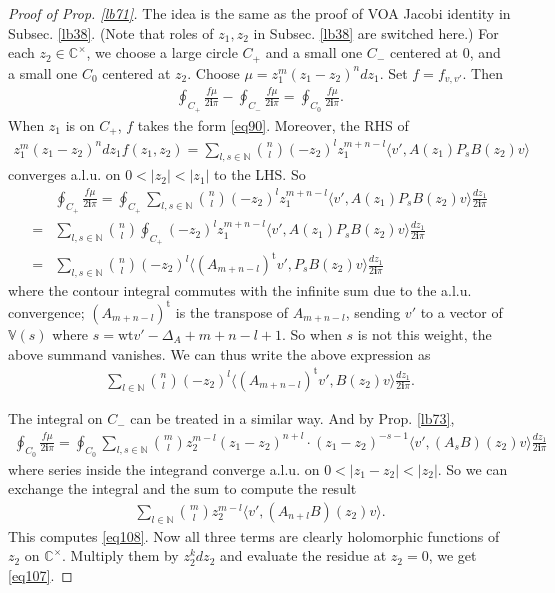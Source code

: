 \documentclass[11pt,b5paper,notitlepage]{article}
\theoremstyle{definition}
\theoremstyle{plain}
\newcommand{\tr}{\mathrm{t}} %
\newcommand{\bk}[1]{\langle {#1}\rangle}
\newcommand{\im}{\mathbf{i}}
\newcommand{\Vbb}{\mathbb V}
\newcommand{\Cbb}{\mathbb C}
\newcommand{\Nbb}{\mathbb N}
\newcommand{\wt}{\mathrm{wt}}
\numberwithin{equation}{section}
\begin{document}
\begin{proof}[Proof of Prop. \ref{lb71}]
The idea is the same as the proof of VOA Jacobi identity in Subsec. \ref{lb38}. (Note that roles of $z_1,z_2$ in Subsec. \ref{lb38} are switched here.) For each $z_2\in\Cbb^\times$, we choose a large circle $C_+$ and a small one $C_-$ centered at $0$, and a small one $C_0$ centered at $z_2$. Choose $\mu=z_1^m(z_1-z_2)^ndz_1$. Set $f=f_{v,v'}$. Then 
\begin{align}\label{eq108}
	\oint_{C_+}\frac{f\mu}{2\im\pi} -\oint_{C_-}\frac{f\mu}{2\im\pi}=\oint_{C_0} \frac{f\mu}{2\im\pi}.	
\end{align}
When $z_1$ is on $C_+$, $f$ takes the form \eqref{eq90}. Moreover, the RHS of
\begin{align*}
z_1^m(z_1-z_2)^ndz_1f(z_1,z_2)=\sum_{l,s\in\Nbb}{n\choose l}(-z_2)^lz_1^{m+n-l}\bk{v',A(z_1)P_sB(z_2)v}	
\end{align*}
converges a.l.u. on $0<|z_2|<|z_1|$ to the LHS. So
\begin{align*}
&\oint_{C_+}\frac{f\mu}{2\im\pi}=\oint_{C_+}\sum_{l,s\in\Nbb}{n\choose l}(-z_2)^lz_1^{m+n-l}\bk{v',A(z_1)P_sB(z_2)v}\frac{dz_1}{2\im\pi}\\
=&\sum_{l,s\in\Nbb}{n\choose l}\oint_{C_+}(-z_2)^lz_1^{m+n-l}\bk{v',A(z_1)P_sB(z_2)v}\frac{dz_1}{2\im\pi}\\
=&\sum_{l,s\in\Nbb}{n\choose l}(-z_2)^l\bk{(A_{m+n-l})^\tr v',P_sB(z_2)v}\frac{dz_1}{2\im\pi}
\end{align*}
where the contour integral commutes with the infinite sum due to the a.l.u. convergence; $(A_{m+n-l})^\tr$ is the transpose of $A_{m+n-l}$, sending $v'$ to a vector of $\Vbb(s)$ where $s=\wt v'-\Delta_A+m+n-l+1$. So when $s$ is not this weight, the above summand vanishes. We can thus write the above expression as
\begin{align*}
\sum_{l\in\Nbb}{n\choose l}(-z_2)^l\bk{(A_{m+n-l})^\tr v',B(z_2)v}\frac{dz_1}{2\im\pi}.
\end{align*}



The integral on $C_-$ can be treated in a similar way. And by Prop. \ref{lb73},
\begin{align*}
\oint_{C_0}\frac{f\mu}{2\im\pi}=\oint_{C_0}	\sum_{l,s\in\Nbb}{m\choose l}z_2^{m-l}(z_1-z_2)^{n+l}\cdot (z_1-z_2)^{-s-1}\bk{v',(A_sB)(z_2)v}\frac{dz_1}{2\im\pi}
\end{align*}
where series inside the integrand converge a.l.u. on $0<|z_1-z_2|<|z_2|$. So we can exchange the integral and the sum to compute the result
\begin{align*}
\sum_{l\in\Nbb}{m\choose l}z_2^{m-l}\bk{v',(A_{n+l}B)(z_2)v}.
\end{align*}
This computes \eqref{eq108}. Now all three terms are clearly holomorphic functions of $z_2$ on $\Cbb^\times$. Multiply them by $z_2^kdz_2$ and evaluate the residue at $z_2=0$, we get \eqref{eq107}.
\end{proof}
\end{document}
